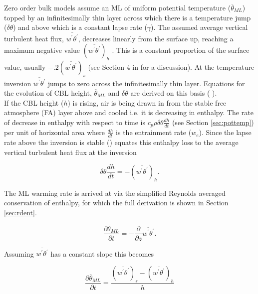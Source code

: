 Zero order bulk models assume an \acs{ML} of uniform potential temperature ($\overline{\theta}_{ML}$) topped by an infinitesimally thin layer across which there is a temperature jump ($\delta \theta$) and above which is a constant lapse rate ($\gamma$).  The assumed average vertical turbulent heat flux, $\overline{w^{'}\theta^{'}}$, decreases linearly from the surface up, reaching a maximum negative value $(\overline{w^{'}\theta^{'}})_{h}$ .  This is a constant proportion of the surface value, usually $-.2(\overline{w^{'}\theta^{'}})_{s}$ (see Section 4 in \citeauthor{Tennekes73} \citeyear{Tennekes73} for a discussion). At the temperature inversion $\overline{w^{'}\theta^{'}}$ jumps to zero across the infinitesimally thin layer.  Equations for the evolution of \acs{CBL} height, $\overline{\theta}_{ML}$ and $\delta \theta$ are derived on this basis (\citeauthor{Tennekes73} \citeyear{Tennekes73}).\\

If the \acs{CBL} height ($h$) is rising, air is being drawn in from the stable free atmosphere (FA) layer above and cooled i.e. it is decreasing in enthalpy.  The rate of decrease in enthalpy with respect to time is $c_{p}\rho \delta \theta \frac{dh}{dt}$ (see Section \ref{sec:pottemp}) per unit of horizontal area where $\frac{dh}{dt}$ is the entrainment rate ($w_{e}$).  Since the lapse rate above the inversion is stable \citeauthor{Tennekes73} (\citeyear{Tennekes73}) equates this enthalpy loss to the average vertical turbulent heat flux at the inversion

\begin{equation}
\delta \theta \frac{dh}{dt} = -(\overline{w^{'}\theta^{'}})_{h}. 
\end{equation}  

The \acs{ML} warming rate is arrived at via the simplified Reynolds averaged conservation of enthalpy, for which the full derivation is shown in Section \ref{sec:rdent}.

\begin{equation}
\label{eq:warming}
\frac{\partial \overline{\theta}_{ML}}{\partial t} = -\frac{\partial}{\partial z}\overline{w^{'}\theta^{'}}.
\end{equation}

Assuming $\overline{w^{'}\theta^{'}}$ has a constant slope this becomes

\begin{equation}
\frac{\partial \overline{\theta}_{ML}}{\partial t} = \frac{(\overline{w^{'}\theta^{'}})_{s}-(\overline{w^{'}\theta^{'}})_{h}}{h}
\end{equation}

